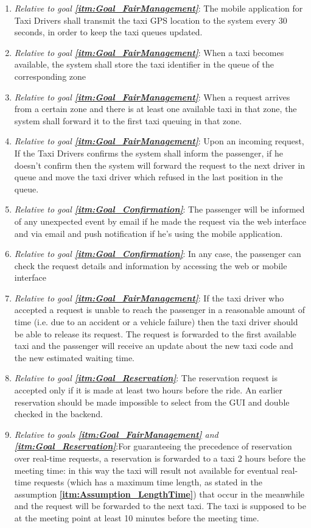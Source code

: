 \documentclass[11pt, a4paper,titlepage]{article}
\newcommand{\linkitm}[1]{\underline{\textbf{\ref{#1}}}}
\begin{document}
	\begin{enumerate}
		\item \textit{Relative to goal \linkitm{itm:Goal_FairManagement}}: The mobile application for Taxi Drivers shall transmit the taxi GPS location to the system every 30 seconds, in order to keep the taxi queues updated.
		\item \textit{Relative to goal \linkitm{itm:Goal_FairManagement}}: When a taxi becomes available, the system shall store the taxi identifier in the queue of the corresponding zone
		\item \textit{Relative to goal \linkitm{itm:Goal_FairManagement}}: When a request arrives from a certain zone and there is at least one available taxi in that zone, the system shall forward it to the first taxi queuing in that zone.
		\item \textit{Relative to goal \linkitm{itm:Goal_FairManagement}}: Upon an incoming request, If the Taxi Drivers confirms  the system shall inform the passenger, if he doesn’t confirm then the system will forward the request to the next driver in queue and move the taxi driver which refused in the last position in the queue.
		\item \textit{Relative to goal \linkitm{itm:Goal_Confirmation}}: The passenger will be informed of any unexpected event by email if he made the request via the web interface and via email and push notification if he’s using the mobile application. 
		\item \textit{Relative to goal \linkitm{itm:Goal_Confirmation}}: In any case, the passenger can check the request details and information by accessing the web or mobile interface
		\item \textit{Relative to goal \linkitm{itm:Goal_FairManagement}}: If the taxi driver who accepted a request is unable to reach the passenger in a reasonable amount of time (i.e. due to an accident or a vehicle failure) then the taxi driver should be able to release its request. The request is forwarded to the first available taxi and the passenger will receive an update about the new taxi code and the new estimated waiting time.
		\item \textit{Relative to goal \linkitm{itm:Goal_Reservation}}: The reservation request is accepted only if it is made at least two hours before the ride. An earlier reservation should be made impossible to select from the GUI and double checked in the backend.
		\item \textit{Relative to goals \linkitm{itm:Goal_FairManagement} and \linkitm{itm:Goal_Reservation}}:For guaranteeing the precedence of reservation over real-time requests, a reservation is forwarded to a taxi 2 hours before the meeting time: in this way the taxi will result not available for eventual real-time requests (which has a maximum time length, as stated in the assumption \linkitm{itm:Assumption_LengthTime}) that occur in the meanwhile and the request will be forwarded to the next taxi. The taxi is supposed to be at the meeting point at least 10 minutes before the meeting time.

\end{enumerate}
\end{document}
